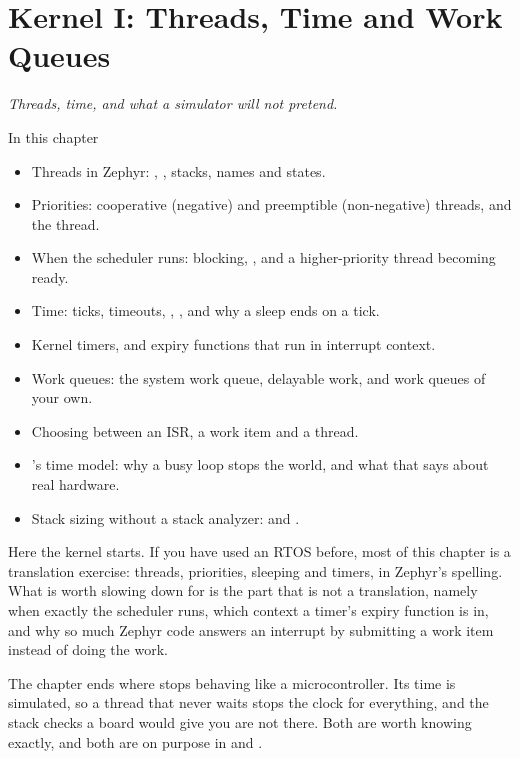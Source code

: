 
\chapter{Kernel I: Threads, Time and Work Queues}
\label{c3:ch:threads}\label{c3:ch}

{\large\itshape Threads, time, and what a simulator will not pretend.\par}

\begin{chapterbox}{In this chapter}
\begin{itemize}
  \item Threads in Zephyr: , , stacks, names and states.
  \item Priorities: cooperative (negative) and preemptible (non-negative) threads, and the 
    thread.
  \item When the scheduler runs: blocking, , and a higher-priority thread becoming ready.
  \item Time: ticks, timeouts, , , and why a sleep ends on a tick.
  \item Kernel timers, and expiry functions that run in interrupt context.
  \item Work queues: the system work queue, delayable work, and work queues of your own.
  \item Choosing between an ISR, a work item and a thread.
  \item {}’s time model: why a busy loop stops the world, and what that says about real
    hardware.
  \item Stack sizing without a stack analyzer:  and .
\end{itemize}
\end{chapterbox}

Here the kernel starts. If you have used an RTOS before, most of this chapter is a translation
exercise: threads, priorities, sleeping and timers, in Zephyr's spelling. What is worth slowing down
for is the part that is not a translation, namely when exactly the scheduler runs, which context a
timer's expiry function is in, and why so much Zephyr code answers an interrupt by submitting a work
item instead of doing the work.

The chapter ends where  stops behaving like a microcontroller. Its time is
simulated, so a thread that never waits stops the clock for everything, and the stack checks a board
would give you are not there. Both are worth knowing exactly, and both are on purpose in
 and .




